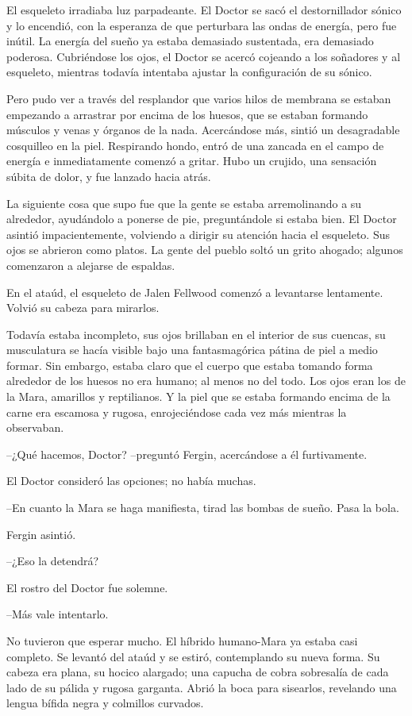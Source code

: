 El esqueleto irradiaba luz parpadeante. El Doctor se sacó el destornillador sónico y lo encendió, con la esperanza de que perturbara las ondas de energía, pero fue inútil. La energía del sueño ya estaba demasiado sustentada, era demasiado poderosa. Cubriéndose los ojos, el Doctor se acercó cojeando a los soñadores y al esqueleto, mientras todavía intentaba ajustar la configuración de su sónico.

Pero pudo ver a través del resplandor que varios hilos de membrana se estaban empezando a arrastrar por encima de los huesos, que se estaban formando músculos y venas y órganos de la nada. Acercándose más, sintió un desagradable cosquilleo en la piel. Respirando hondo, entró de una zancada en el campo de energía e inmediatamente comenzó a gritar. Hubo un crujido, una sensación súbita de dolor, y fue lanzado hacia atrás.

La siguiente cosa que supo fue que la gente se estaba arremolinando a su alrededor, ayudándolo a ponerse de pie, preguntándole si estaba bien. El Doctor asintió impacientemente, volviendo a dirigir su atención hacia el esqueleto. Sus ojos se abrieron como platos. La gente del pueblo soltó un grito ahogado; algunos comenzaron a alejarse de espaldas.

En el ataúd, el esqueleto de Jalen Fellwood comenzó a levantarse lentamente. Volvió su cabeza para mirarlos.

Todavía estaba incompleto, sus ojos brillaban en el interior de sus cuencas, su musculatura se hacía visible bajo una fantasmagórica pátina de piel a medio formar. Sin embargo, estaba claro que el cuerpo que estaba tomando forma alrededor de los huesos no era humano; al menos no del todo. Los ojos eran los de la Mara, amarillos y reptilianos. Y la piel que se estaba formando encima de la carne era escamosa y rugosa, enrojeciéndose cada vez más mientras la observaban.

--¿Qué hacemos, Doctor? --preguntó Fergin, acercándose a él furtivamente.

El Doctor consideró las opciones; no había muchas.

--En cuanto la Mara se haga manifiesta, tirad las bombas de sueño. Pasa la bola.

Fergin asintió.

--¿Eso la detendrá?

El rostro del Doctor fue solemne.

--Más vale intentarlo.

No tuvieron que esperar mucho. El híbrido humano-Mara ya estaba casi completo. Se levantó del ataúd y se estiró, contemplando su nueva forma. Su cabeza era plana, su hocico alargado; una capucha de cobra sobresalía de cada lado de su pálida y rugosa garganta. Abrió la boca para sisearlos, revelando una lengua bífida negra y colmillos curvados.

